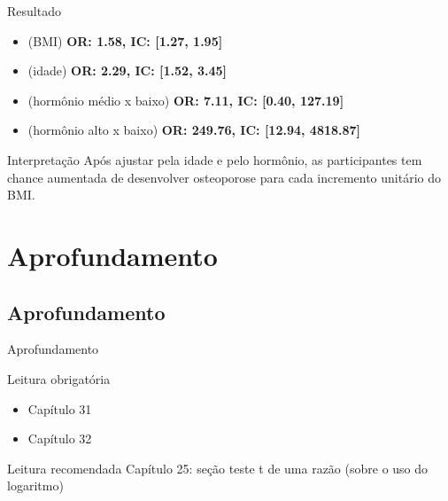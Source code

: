 \documentclass{beamer}
\begin{document}
\begin{frame}{\scriptsize }
  \begin{block}{Resultado}
    \footnotesize
    \begin{itemize}
    \item {\small (BMI)} {\bf OR: 1.58, IC: [1.27, 1.95]}
    \item {\small (idade)} {\bf OR: 2.29, IC: [1.52, 3.45]}
    \item {\small (hormônio médio x baixo)} {\bf OR: 7.11, IC: [0.40, 127.19]}
    \item {\small (hormônio alto x baixo)} {\bf OR: 249.76, IC: [12.94, 4818.87]}
    \end{itemize}
  \end{block}
    \begin{block}{Interpretação}
    \footnotesize
    Após ajustar pela idade e pelo hormônio, as participantes tem chance aumentada de desenvolver osteoporose para cada incremento unitário do BMI.
  \end{block}
\end{frame}

\section{Aprofundamento}

\subsection{Aprofundamento}

\begin{frame}{\scriptsize Aprofundamento}
  \begin{block}{Leitura obrigatória}
    \begin{itemize}
      \footnotesize
    \item Capítulo 31
    \item Capítulo 32
    \end{itemize}
  \end{block}
  \begin{block}{Leitura recomendada}
    \scriptsize
    Capítulo 25: seção teste t de uma razão ({\tiny sobre o uso do logaritmo})


  \end{block}
\end{frame}
\end{document}
